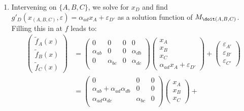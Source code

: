 \begin{enumerate}[label=10.\arabic*]
\begin{gradedsolution}
\begin{enumerate}
            \item {} Intervening on $\{A,B,C\}$, we solve for $x_D$ and find $g'_D(x_{(A, B, C)}, \varepsilon)=\alpha_{ad} x_A + \varepsilon_{D'}$ as a solution function of $M_{\doit(A, B, C)}$. Filling this in at $f$ leads to:
            \begin{align*}
                \begin{pmatrix}
                    \tilde{f}_A(x) \\ \tilde{f}_B(x) \\ \tilde{f}_C(x)
                \end{pmatrix}
                 & =
                \begin{pmatrix}
                    0           & 0           & 0 & 0           \\
                    \alpha_{ab} & 0           & 0 & \alpha_{db} \\
                    0           & \alpha_{bc} & 0 & \alpha_{dc} \\
                \end{pmatrix}
                \begin{pmatrix}
                    x_A \\ x_B \\ x_C \\ \alpha_{ad} x_A + \varepsilon_{D'}
                \end{pmatrix}
                +
                \begin{pmatrix}
                    \varepsilon_{A'} \\ \varepsilon_{B'} \\ \varepsilon_{C'}
                \end{pmatrix} \\
                 & =
                \begin{pmatrix}
                    0                                  & 0           & 0 \\
                    \alpha_{ab}+\alpha_{ad}\alpha_{db} & 0           & 0 \\
                    \alpha_{ad}\alpha_{dc}             & \alpha_{bc} & 0 \\
                \end{pmatrix}
                \begin{pmatrix}
                    x_A \\ x_B \\ x_C
                \end{pmatrix}
                +

\end{align*}
\end{enumerate}
\end{gradedsolution}
\end{enumerate}
